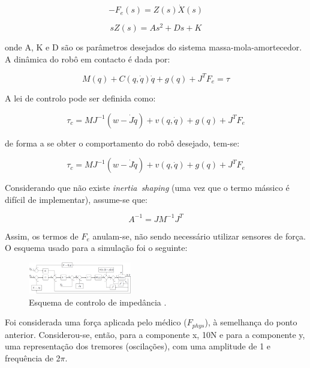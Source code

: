 \documentclass[a4paper,twocolumn,final,11pt]{article}
\begin{document}
\begin{equation}
-F_e(s) = Z(s)\dot{X}(s)
\end{equation}

\begin{equation}
sZ(s) = As^{2} + Ds + K
\end{equation}

onde A, K e D são os parâmetros desejados do sistema massa-mola-amortecedor. A dinâmica do robô em contacto é dada por:

\begin{equation}
M(q) + C(q,\dot{q})\dot{q} + g(q) + J^{T}F_e = \tau
\end{equation}

A lei de controlo pode ser definida como:

\begin{equation}
\tau_c = MJ^{-1}(w-\dot{J}\dot{q}) + v(q,\dot{q}) + g(q) + J^{T}F_e
\end{equation}

de forma a se obter o comportamento do robô desejado, tem-se:

\begin{equation}
\tau_c = MJ^{-1}(w-\dot{J}\dot{q}) + v(q,\dot{q}) + g(q) + J^{T}F_e
\end{equation}

Considerando que não existe \textit{inertia~shaping} (uma vez que o termo mássico é difícil de implementar), assume-se que:

\begin{equation}
A^{-1} = JM^{-1}J^{T}
\end{equation}

Assim, os termos de $F_e$ anulam-se, não sendo necessário utilizar sensores de força.
\\

O esquema usado para a simulação foi o seguinte:

\begin{figure}[H]
	\centering
	\includegraphics[width=0.4\textwidth]{esquema_9.png}
	\caption{Esquema de controlo de impedância \cite{Cortesão}.}
  \label{}
\end{figure}

Foi considerada uma força aplicada pelo médico ($F_{phys}$), à semelhança do ponto anterior. 
Considerou-se, então, para a componente x, 10N e para a componente y, uma representação dos tremores (oscilações), com uma amplitude de 1 e frequência de 2$\pi$.
\end{document}

